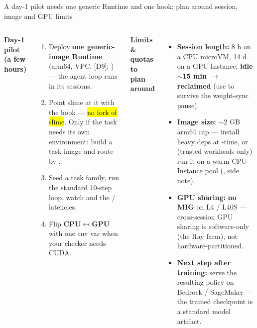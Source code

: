 \begin{frame}{A day-1 pilot needs one generic Runtime and one hook; plan around session, image and GPU limits}
\begin{columns}[T]
{\footnotesize\textbf{\color{awsteal}Day-1 pilot (a few hours)}\par}
\begin{enumerate}\scriptsize\setlength{\itemsep}{1.4mm}
\item Deploy \textbf{one generic-image Runtime} (arm64, VPC,  [D9]; ) --- the agent loop runs in its sessions.
\item Point slime at it with the  hook --- \hl{no fork of slime}. Only if the task needs its own environment: build a task image and route by .
\item Seed a task family, run the standard 10-step loop, watch  and the \cc{[sbx-op]} /  latencies.
\item Flip \textbf{CPU$\leftrightarrow$GPU} with one env var when your checker needs CUDA.
\end{enumerate}
{\footnotesize\textbf{\color{awsteal}Limits \& quotas to plan around}\par}
\begin{itemize}\scriptsize\setlength{\itemsep}{1.4mm}
\item \textbf{Session length:} 8 h on a CPU microVM, 14 d on a GPU Instance; \textbf{idle $\sim$15 min $\rightarrow$ reclaimed} (use  to survive the weight-sync pause).
\item \textbf{Image size:} $\sim$2 GB arm64 cap --- install heavy deps at -time, or (trusted workloads only) run it on a warm CPU Instance pool (, side note).
\item \textbf{GPU sharing:} \textbf{no MIG} on L4 / L40S --- cross-session GPU sharing is software-only (the Ray farm), not hardware-partitioned.
\item \textbf{Next step after training:} serve the resulting policy on Bedrock / SageMaker --- the trained checkpoint is a standard model artifact.
\end{itemize}
\end{columns}
\end{frame}

